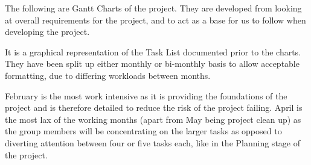The following are Gantt Charts of the project. They are developed from looking 
at overall requirements for the project, and to act as a base for us to follow 
when developing the project.

It is a graphical representation of the Task List documented prior to the 
charts.  They have been split up either monthly or bi-monthly basis to allow 
acceptable formatting, due to differing workloads between months.

February is the most work intensive as it is providing the foundations of the
project and is therefore detailed to reduce the risk of the project failing.
April is the most lax of the working months (apart from May being project
clean up) as the group members will be concentrating on the larger tasks as
opposed to diverting attention between four or five tasks each, like in the
Planning stage of the project.
\pagebreak

